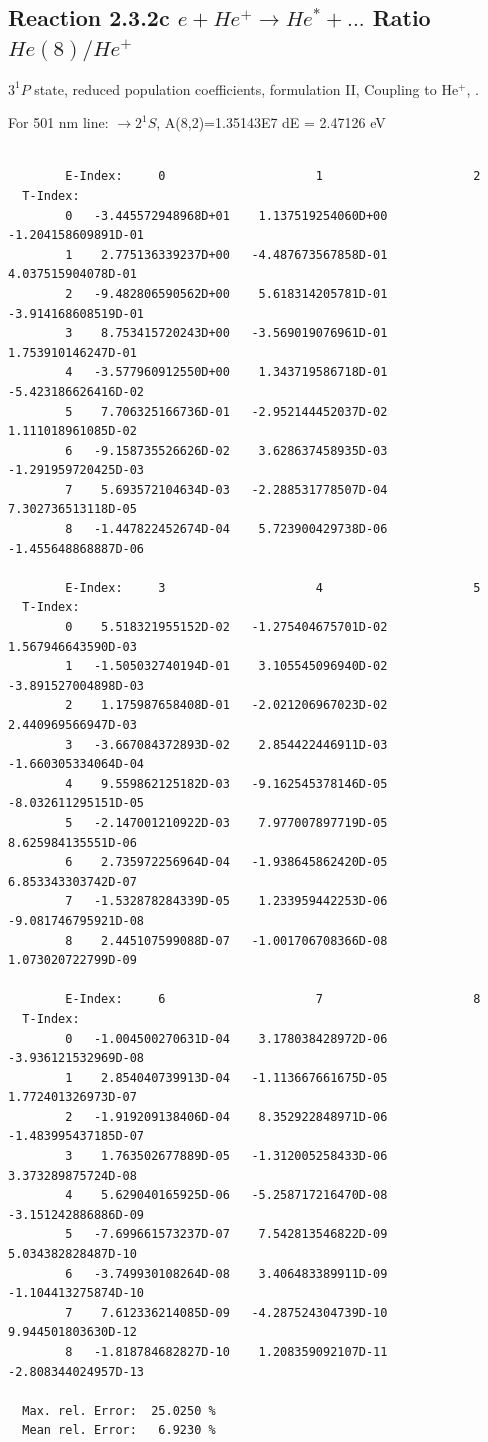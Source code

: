 \documentclass[12pt,dvips]{article}
\begin{document}
\subsection{
  Reaction 2.3.2c $e + He^+ \rightarrow He^* + ... $ Ratio $He(8)/He^+$
}

  $3^1P$ state,
  reduced population coefficients, formulation II,
  Coupling to He$^+$, \cite{kn:Fujimoto}.

  For 501 nm line: $\rightarrow 2^1S$, A(8,2)=1.35143E7 dE = 2.47126 eV

\begin{small}\begin{verbatim}

        E-Index:     0                     1                     2
  T-Index:
        0   -3.445572948968D+01    1.137519254060D+00   -1.204158609891D-01
        1    2.775136339237D+00   -4.487673567858D-01    4.037515904078D-01
        2   -9.482806590562D+00    5.618314205781D-01   -3.914168608519D-01
        3    8.753415720243D+00   -3.569019076961D-01    1.753910146247D-01
        4   -3.577960912550D+00    1.343719586718D-01   -5.423186626416D-02
        5    7.706325166736D-01   -2.952144452037D-02    1.111018961085D-02
        6   -9.158735526626D-02    3.628637458935D-03   -1.291959720425D-03
        7    5.693572104634D-03   -2.288531778507D-04    7.302736513118D-05
        8   -1.447822452674D-04    5.723900429738D-06   -1.455648868887D-06

        E-Index:     3                     4                     5
  T-Index:
        0    5.518321955152D-02   -1.275404675701D-02    1.567946643590D-03
        1   -1.505032740194D-01    3.105545096940D-02   -3.891527004898D-03
        2    1.175987658408D-01   -2.021206967023D-02    2.440969566947D-03
        3   -3.667084372893D-02    2.854422446911D-03   -1.660305334064D-04
        4    9.559862125182D-03   -9.162545378146D-05   -8.032611295151D-05
        5   -2.147001210922D-03    7.977007897719D-05    8.625984135551D-06
        6    2.735972256964D-04   -1.938645862420D-05    6.853343303742D-07
        7   -1.532878284339D-05    1.233959442253D-06   -9.081746795921D-08
        8    2.445107599088D-07   -1.001706708366D-08    1.073020722799D-09

        E-Index:     6                     7                     8
  T-Index:
        0   -1.004500270631D-04    3.178038428972D-06   -3.936121532969D-08
        1    2.854040739913D-04   -1.113667661675D-05    1.772401326973D-07
        2   -1.919209138406D-04    8.352922848971D-06   -1.483995437185D-07
        3    1.763502677889D-05   -1.312005258433D-06    3.373289875724D-08
        4    5.629040165925D-06   -5.258717216470D-08   -3.151242886886D-09
        5   -7.699661573237D-07    7.542813546822D-09    5.034382828487D-10
        6   -3.749930108264D-08    3.406483389911D-09   -1.104413275874D-10
        7    7.612336214085D-09   -4.287524304739D-10    9.944501803630D-12
        8   -1.818784682827D-10    1.208359092107D-11   -2.808344024957D-13

  Max. rel. Error:  25.0250 %
  Mean rel. Error:   6.9230 %


\end{verbatim}\end{small}
\end{document}
